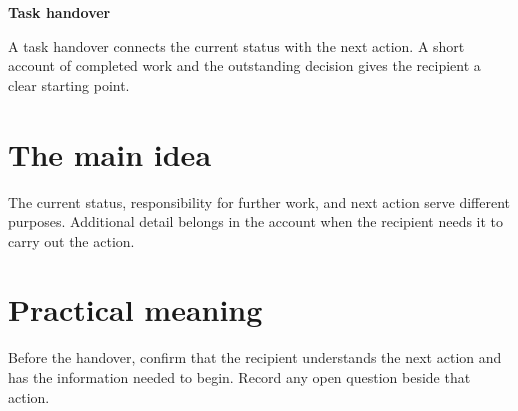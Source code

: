 \def\lakitlanguageprofile{english}
\def\lakitmainlanguage{english}
\def\lakitdocumentclass{article}
\def\lakitclassoptions{11pt,a4paper}
\def\lakitgeometryoptions{margin=2.2cm,headheight=14pt}
\def\lakitlinespread{1.18}
\def\lakitparagraphstyle{block}




{\LARGE\sffamily\bfseries\noindent Task handover\par}\medskip
A task handover connects the current status with the next action. A short
account of completed work and the outstanding decision gives the recipient
a clear starting point.
\section{The main idea}
The current status, responsibility for further work, and next action serve
different purposes. Additional detail belongs in the account when the recipient
needs it to carry out the action.
\section{Practical meaning}
Before the handover, confirm that the recipient understands the next action
and has the information needed to begin. Record any open question beside that
action.

